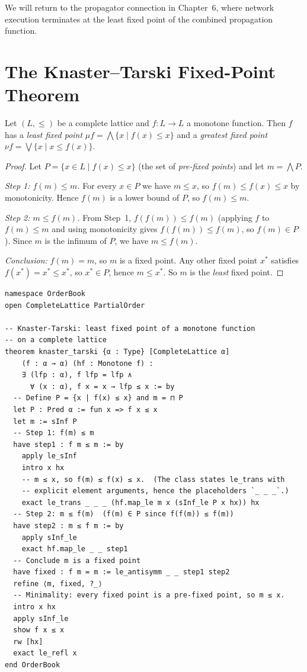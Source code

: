 \documentclass[12pt, a4paper, openright]{book}
\theoremstyle{thmstyle}
\theoremstyle{defstyle}
\newenvironment{thmbox}[1][]{%
  \begin{tcolorbox}[thmbox, title={\ifx\\#1\\Theorem\else#1\fi}]%
}{\end{tcolorbox}}
\newenvironment{notebox}{%
  \begin{tcolorbox}[notebox]%
}{\end{tcolorbox}}
\begin{document}
\begin{notebox}
  We will return to the propagator connection in Chapter~6, where network
  execution terminates at the least fixed point of the combined propagation
  function.
\end{notebox}

\section{The Knaster--Tarski Fixed-Point Theorem}

\begin{thmbox}[Knaster--Tarski (1955)]
  Let $(L, \leq)$ be a complete lattice and $f : L \to L$ a monotone function.
  Then $f$ has a \emph{least fixed point}
  $\mu f = \bigwedge \{ x \mid f(x) \leq x \}$
  and a \emph{greatest fixed point}
  $\nu f = \bigvee \{ x \mid x \leq f(x) \}$.
\end{thmbox}

\begin{proof}
  Let $P = \{ x \in L \mid f(x) \leq x \}$ (the set of \emph{pre-fixed points})
  and let $m = \bigwedge P$.

  \textit{Step 1: $f(m) \leq m$.}
  For every $x \in P$ we have $m \leq x$, so $f(m) \leq f(x) \leq x$ by
  monotonicity. Hence $f(m)$ is a lower bound of $P$, so $f(m) \leq m$.

  \textit{Step 2: $m \leq f(m)$.}
  From Step~1, $f(f(m)) \leq f(m)$ (applying $f$ to $f(m) \leq m$ and using
  monotonicity gives $f(f(m)) \leq f(m)$, so $f(m) \in P$). Since $m$ is the
  infimum of $P$, we have $m \leq f(m)$.

  \textit{Conclusion:} $f(m) = m$, so $m$ is a fixed point. Any other fixed
  point $x^*$ satisfies $f(x^*) = x^* \leq x^*$, so $x^* \in P$, hence
  $m \leq x^*$. So $m$ is the \emph{least} fixed point.
\end{proof}

\begin{verbatim}
namespace OrderBook
open CompleteLattice PartialOrder

-- Knaster-Tarski: least fixed point of a monotone function
-- on a complete lattice
theorem knaster_tarski {α : Type} [CompleteLattice α]
    (f : α → α) (hf : Monotone f) :
    ∃ (lfp : α), f lfp = lfp ∧
      ∀ (x : α), f x = x → lfp ≤ x := by
  -- Define P = {x | f(x) ≤ x} and m = ⊓ P
  let P : Pred α := fun x => f x ≤ x
  let m := sInf P
  -- Step 1: f(m) ≤ m
  have step1 : f m ≤ m := by
    apply le_sInf
    intro x hx
    -- m ≤ x, so f(m) ≤ f(x) ≤ x.  (The class states le_trans with
    -- explicit element arguments, hence the placeholders `_ _ _`.)
    exact le_trans _ _ _ (hf.map_le m x (sInf_le P x hx)) hx
  -- Step 2: m ≤ f(m)  (f(m) ∈ P since f(f(m)) ≤ f(m))
  have step2 : m ≤ f m := by
    apply sInf_le
    exact hf.map_le _ _ step1
  -- Conclude m is a fixed point
  have fixed : f m = m := le_antisymm _ _ step1 step2
  refine ⟨m, fixed, ?_⟩
  -- Minimality: every fixed point is a pre-fixed point, so m ≤ x.
  intro x hx
  apply sInf_le
  show f x ≤ x
  rw [hx]
  exact le_refl x
end OrderBook
\end{verbatim}
\end{document}
